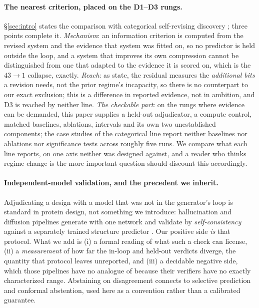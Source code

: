 \documentclass[11pt]{article}
\begin{document}
\paragraph{The nearest criterion, placed on the D1--D3 rungs.} \S\ref{sec:intro} states the comparison with
categorical self-revising discovery \citep{selfrevising}; three points complete it. \emph{Mechanism}: an
information criterion is computed from the revised system and the evidence that system was fitted on, so no
predictor is held outside the loop, and a system that improves its own compression cannot be distinguished
from one that adapted to the evidence it is scored on, which is the $43\!\to\!1$ collapse, exactly.
\emph{Reach}: as \citet{selfrevising} state, the residual measures the \emph{additional bits} a revision
needs, not the prior regime's incapacity, so there is no counterpart to our exact exclusion; this is a
difference in reported evidence, not in ambition, and D3 is reached by neither line. \emph{The checkable
part}: on the rungs where evidence can be demanded, this paper supplies a held-out adjudicator, a compute
control, matched baselines, ablations, intervals and its own two unestablished components; the case studies of
the categorical line report neither baselines nor ablations nor significance tests across roughly five runs.
We compare what each line reports, on one axis neither was designed against, and a reader who thinks regime
change is the more important question should discount this accordingly.

\paragraph{Independent-model validation, and the precedent we inherit.} Adjudicating a design with a model
that was not in the generator's loop is standard in protein design, not something we introduce: hallucination
and diffusion pipelines generate with one network and validate by \emph{self-consistency} against a separately
trained structure predictor \citep{anishchenko2021hallucination,watson2023rfdiffusion}. Our positive side
\emph{is} that protocol. What we add is (i) a formal reading of what such a check can license, (ii) a
\emph{measurement} of how far the in-loop and held-out verdicts diverge, the quantity that protocol leaves
unreported, and (iii) a decidable negative side, which those pipelines have no analogue of because their
verifiers have no exactly characterized range. Abstaining on disagreement connects to selective prediction and
conformal abstention, used here as a convention rather than a calibrated guarantee.
\end{document}
